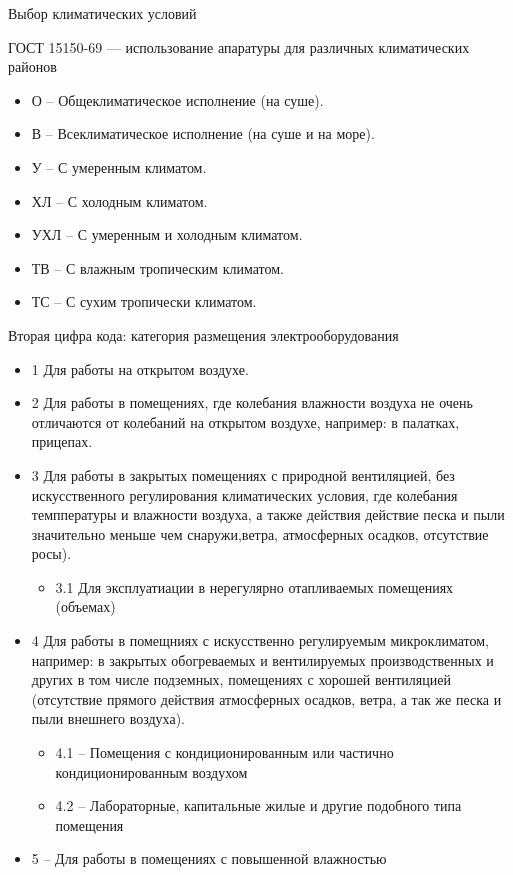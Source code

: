 \documentclass{article}
\begin{document}
Выбор климатических условий

ГОСТ 15150-69 --- использование апаратуры для различных климатических районов

\begin{itemize}
	\item О -- Общеклиматическое исполнение (на суше).
	\item В -- Всеклиматическое исполнение (на суше и на море).
	\item У -- С умеренным климатом.
	\item ХЛ -- С холодным климатом.
	\item УХЛ -- С умеренным и холодным климатом.
	\item ТВ -- С влажным тропическим климатом.
	\item ТС -- С сухим тропически климатом.
\end{itemize}

Вторая цифра кода: категория размещения электрооборудования
\begin{itemize}
	\item 1 Для работы на открытом воздухе.
	\item 2 Для работы в помещениях, где колебания влажности воздуха не очень отличаются от колебаний на открытом воздухе, например: в палатках, прицепах.
	\item 3 Для работы в закрытых помещениях с природной вентиляцией, без искусственного регулирования климатических условия, где колебания темппературы и влажности воздуха, а также действия действие песка и пыли значительно меньше чем снаружи,ветра, атмосферных осадков, отсутствие росы).
	\begin{itemize}
		\item 3.1 Для эксплуатиации в нерегулярно отапливаемых помещениях (объемах)
	\end{itemize}
	\item 4 Для работы в помещниях с искусственно регулируемым микроклиматом, например: в закрытых обогреваемых и вентилируемых производственных и других в том числе подземных, помещениях с хорошей вентиляцией (отсутствие прямого действия атмосферных осадков, ветра, а так же песка и пыли внешнего воздуха).
	\begin{itemize}
		\item 4.1 -- Помещения с кондиционированным или частично кондиционированным воздухом
		\item 4.2 -- Лабораторные, капитальные жилые и другие подобного типа помещения
	\end{itemize}
	\item 5 -- Для работы в помещениях с повышенной влажностью
\end{itemize}
\end{document}
